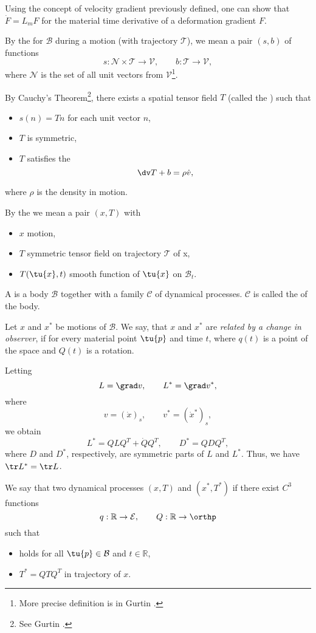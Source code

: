 Using the concept of velocity gradient previously defined, one can show that
$\dot F=L_m F$ for the material time derivative of a deformation gradient $F$.

By the  for $\mathcal B$ during a motion (with trajectory $\mathcal T$), 
we mean a pair $(s,b)$ of functions
$$s:\mathcal N\times\mathcal T\rightarrow\mathcal V, \qquad b:\mathcal T\rightarrow\mathcal V,$$
where $\mathcal N$ is the set of all unit vectors 
from $\mathcal V$\footnote{More precise definition is in Gurtin \cite[p. 99]{gurtin}.}.

By Cauchy's Theorem\footnote{See Gurtin \cite[p. 101]{gurtin}.}, 
there exists a spatial tensor field $T$ (called the ) such that 
\begin{itemize}
 \item $s(n)=Tn$ for each unit vector $n$,
 \item $T$ is symmetric,
 \item $T$ satisfies the  $$\dv T+b=\rho\dot v,$$  
\end{itemize}
where $\rho$ is the density in motion.

By the  we mean a pair $(x,T)$ with 
\begin{itemize}
 \item $x$ motion,
 \item $T$ symmetric tensor field on trajectory $\mathcal T$ of x,
 \item $T(\tu{x},t)$ smooth function of $\tu{x}$ on $\mathcal B_t$.
\end{itemize}

A  is a body $\mathcal B$ together with a family $\mathcal C$ 
of dynamical processes. $\mathcal C$ is called the  of the body.

Let $x$ and $x^*$ be motions of $\mathcal B$. 
We say, that $x$ and $x^*$ are {\it related by a change in observer}, if
for every material point $\tu{p}$ and time $t$, where $q(t)$ is a point of the 
space and $Q(t)$ is a rotation. 

Letting $$L=\grad v, \qquad L^*=\grad v^*,$$ where 
$$v=(\dot x)_s, \qquad v^*=(\dot x^*)_s,$$ we obtain
$$L^*=QLQ^T+\dot{Q}Q^T,\qquad D^*=QDQ^T,$$ where $D$ and $D^*$, respectively, are symmetric
parts of $L$ and $L^*$.	Thus, we have $\tr L^*=\tr L$.

We say that two dynamical processes $(x,T)$ and $(x^*,T^*)$ 
 if there exist $C^3$ functions 
$$q:\mathbb R\rightarrow\mathcal E, \qquad Q:\mathbb R\rightarrow\orthp$$
such that 
\begin{itemize}
	\item {} holds for all $\tu{p}\in\mathcal B$ and $t\in\mathbb R$,
	\item $T^*=QTQ^T$ in trajectory of $x$.
\end{itemize}

